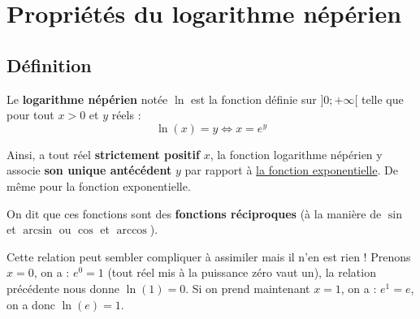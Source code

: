 






	\section{Propriétés du logarithme népérien}

	\subsection{Définition}

	\begin{formula}[Définition]
		Le \textbf{logarithme népérien} notée $\ln$ est la fonction définie sur $]0;+\infty[$ telle que pour tout $x > 0$ et $y$ réels :
		\[ \ln(x) = y \iff x = e^y \]
	\end{formula}

	Ainsi, a tout réel \textbf{strictement positif} $x$, la fonction logarithme népérien y associe \textbf{son unique antécédent} $y$ par rapport à \href{https://bacomathiqu.es/cours/premiere/fonction-exponentielle/}{la fonction exponentielle}. De même pour la fonction exponentielle.

	On dit que ces fonctions sont des \textbf{fonctions réciproques} (à la manière de $\sin$ et $\arcsin$ ou $\cos$ et $\arccos$).

	\begin{tip}[Exemple]
		Cette relation peut sembler compliquer à assimiler mais il n'en est rien ! Prenons $x = 0$, on a :
		\newpar
		$e^0 = 1$ (tout réel mis à la puissance zéro vaut un), la relation précédente nous donne $\ln(1) = 0$.
		\newpar
		Si on prend maintenant $x = 1$, on a :
		\newpar
		$e^1 = e$, on a donc $\ln(e) = 1$.
	\end{tip}

